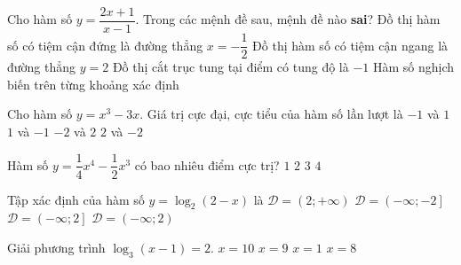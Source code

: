 \begin{ex}%
	Cho hàm số $y=\dfrac{2x+1}{x-1}$. Trong các mệnh đề sau, mệnh đề nào \textbf{sai}?
	\choice
	{\True Đồ thị hàm số có tiệm cận đứng là đường thẳng $x=-\dfrac{1}{2}$}
	{Đồ thị hàm số có tiệm cận ngang là đường thẳng $y=2$}
	{Đồ thị cắt trục tung tại điểm có tung độ là $-1$}
	{Hàm số nghịch biến trên từng khoảng xác định}
\end{ex}



\begin{ex}%
	Cho hàm số $y=x^3-3x$. Giá trị cực đại, cực tiểu của hàm số lần lượt là
	\choice
	{$-1$ và $1$}
	{$1$ và $-1$}
	{$-2$ và $2$}
	{\True $2$ và $-2$}
\end{ex}


\begin{ex}%
	Hàm số $y=\dfrac{1}{4}x^4-\dfrac{1}{2}x^3$ có bao nhiêu điểm cực trị?
	\choice
	{\True $1$}
	{$2$}
	{$3$}
	{$4$}
\end{ex}


\begin{ex}%
	Tập xác định của hàm số $y=\log_2(2-x)$ là
	\choice
	{$\mathscr{D}=\left(2;+\infty\right)$}
	{$\mathscr{D}=\left(-\infty;-2\right]$}
	{$\mathscr{D}=\left(-\infty;2\right]$}
	{\True $\mathscr{D}=\left(-\infty;2 \right)$}
\end{ex}


\begin{ex}%
	Giải phương trình $\log_3(x-1)=2$.
	\choice
	{\True $x=10$}
	{$x=9$}
	{$x=1$}
	{$x=8$}
\end{ex}


